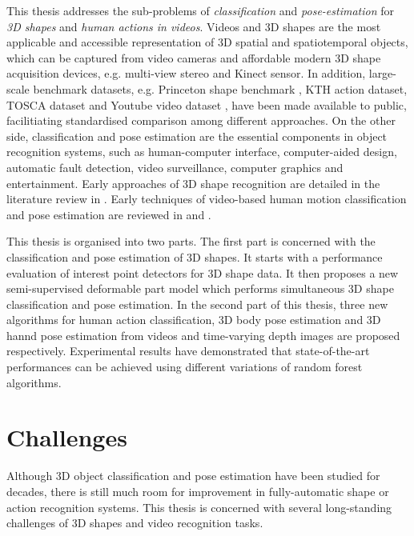 This thesis addresses the sub-problems of \emph{classification} and \emph{pose-estimation} for \emph{3D shapes} and \emph{human actions in videos}. 
Videos and 3D shapes are the most applicable and accessible representation of 3D spatial and spatiotemporal objects, which can be captured from video cameras and affordable modern 3D shape acquisition devices, e.g. multi-view stereo \cite{Vogiatzis2011} and Kinect sensor. 
In addition, large-scale benchmark datasets, e.g. Princeton shape benchmark \cite{Shilane2004},  KTH action dataset\cite{Schuldt2004}, TOSCA dataset \cite{Bronstein2011} and Youtube video dataset \cite{Liu2009}, have been made available to public, facilitiating standardised comparison among different approaches. 
On the other side, classification and pose estimation are the essential components in object recognition systems, such as human-computer interface, computer-aided design, automatic fault detection, video surveillance, computer graphics and entertainment. 
Early approaches of 3D shape recognition are detailed in the literature review in \cite{Besl1985}. Early techniques of video-based human motion classification and pose estimation are reviewed in \cite{Cedras1995, Moeslund2001, Turaga2008} and \cite{Aggarwal1999, Poppe2007}. 

This thesis is organised into two parts.  
The first part is concerned with the classification and pose estimation of 3D shapes. It starts with a performance evaluation of interest point detectors for 3D shape data. It then proposes a new semi-supervised deformable part model which performs simultaneous 3D shape classification and pose estimation. In the second part of this thesis, three new algorithms for human action classification, 3D body pose estimation and 3D hannd pose estimation from videos and time-varying depth images are proposed respectively. Experimental results have demonstrated that state-of-the-art performances can be achieved using different variations of random forest algorithms.    

\section{Challenges}

Although 3D object classification and pose estimation have been studied for decades, there is still much room for improvement in fully-automatic shape or action recognition systems. 
This thesis is concerned with several long-standing challenges of 3D shapes and video recognition tasks.  

